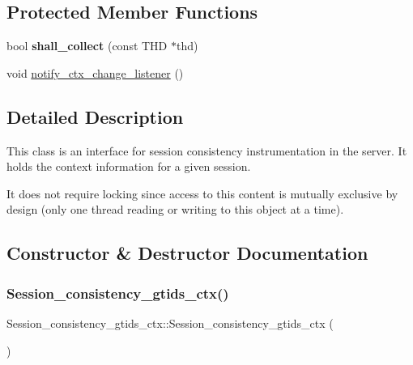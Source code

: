 \subsection*{Protected Member Functions}
\begin{DoxyCompactItemize}
\item 
\mbox{\label{classSession__consistency__gtids__ctx_a1d570046fbfe58343bdbb1a3ff060410}} 
bool {\bfseries shall\+\_\+collect} (const T\+HD $\ast$thd)
\item 
void \mbox{\hyperlink{classSession__consistency__gtids__ctx_a8b315d4cb250e3ac1203e2498ecda698}{notify\+\_\+ctx\+\_\+change\+\_\+listener}} ()
\end{DoxyCompactItemize}


\subsection{Detailed Description}
This class is an interface for session consistency instrumentation in the server. It holds the context information for a given session.

It does not require locking since access to this content is mutually exclusive by design (only one thread reading or writing to this object at a time). 

\subsection{Constructor \& Destructor Documentation}
\mbox{\label{classSession__consistency__gtids__ctx_aec7db00cedbe30bf9b58cc725d3645a1}} 
\subsubsection{\texorpdfstring{Session\+\_\+consistency\+\_\+gtids\+\_\+ctx()}{Session\_consistency\_gtids\_ctx()}}
{\footnotesize\ttfamily Session\+\_\+consistency\+\_\+gtids\+\_\+ctx\+::\+Session\+\_\+consistency\+\_\+gtids\+\_\+ctx (\begin{DoxyParamCaption}{ }\end{DoxyParamCaption})}

